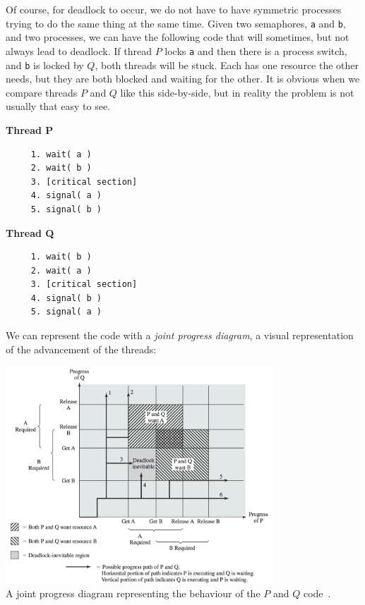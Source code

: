 Of course, for deadlock to occur, we do not have to have symmetric processes trying to do the same thing at the same time. Given two semaphores, \texttt{a} and \texttt{b}, and two processes, we can have the following code that will sometimes, but not always lead to deadlock. If thread $P$ locks \texttt{a} and then there is a process switch, and \texttt{b} is locked by $Q$, both threads will be stuck. Each has one resource the other needs, but they are both blocked and waiting for the other. It is obvious when we compare threads $P$ and $Q$ like this side-by-side, but in reality the problem is not usually that easy to see.

\begin{multicols}{2}
\textbf{Thread P}\vspace{-2em}
  \begin{verbatim}
	 1. wait( a ) 
	 2. wait( b )
	 3. [critical section]
	 4. signal( a )
	 5. signal( b )
  \end{verbatim}
\columnbreak
\textbf{Thread Q}\vspace{-2em}
  \begin{verbatim}
	 1. wait( b ) 
	 2. wait( a )
	 3. [critical section]
	 4. signal( b )
	 5. signal( a )
  \end{verbatim}
\end{multicols}
\vspace{-2em}

We can represent the code with a \textit{joint progress diagram}, a visual representation of the advancement of the threads:

\begin{center}
\includegraphics[width=0.75\textwidth]{images/joint-progress}\\
A joint progress diagram representing the behaviour of the $P$ and $Q$ code~\cite{osi}.
\end{center}

